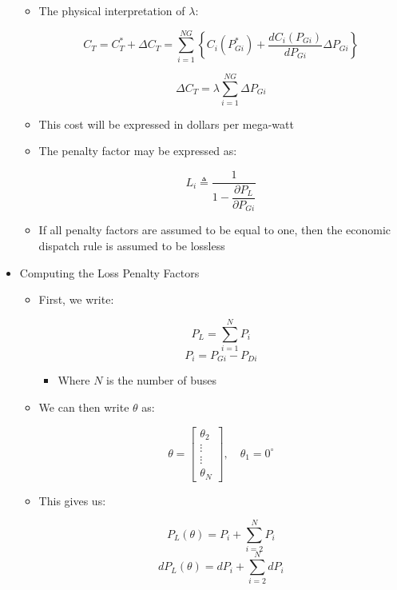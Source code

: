 \begin{itemize}
\begin{itemize}
      \item The physical interpretation of $\lambda$:

        $$C_T=C_{T}^*+\Delta C_T=\sum_{i=1}^{NG}\left\{ C_i(P_{Gi}^*)+\frac{dC_i(P_{Gi})}{dP_{Gi}}\Delta P_{Gi} \right\}$$

        $$\Delta C_T=\lambda\sum_{i=1}^{NG}\Delta P_{Gi}$$

      \item This cost will be expressed in dollars per mega-watt

      \item The penalty factor may be expressed as:

        $$L_i\triangleq \frac{1}{1-\dfrac{\partial P_L}{\partial P_{Gi}}}$$

      \item If all penalty factors are assumed to be equal to one, then the economic dispatch rule is assumed to be lossless

    \end{itemize}

  \item Computing the Loss Penalty Factors

    \begin{itemize}

      \item First, we write:

        $$P_L=\sum_{i=1}^{N}P_i$$
        $$P_i=P_{Gi}-P_{Di}$$

        \begin{itemize}

          \item Where $N$ is the number of buses

        \end{itemize}

      \item We can then write $\theta$ as:

        $$\theta=\left[ \begin{matrix} \theta_2\\\vdots\\\vdots\\\theta_N \end{matrix}\right],\quad \theta_1=0^{\circ}$$

      \item This gives us:

        $$P_L(\theta)=P_i+\sum_{i=2}^{N}P_i$$
        $$dP_L(\theta)=dP_i+\sum_{i=2}^{N}dP_i$$


\end{itemize}
\end{itemize}
